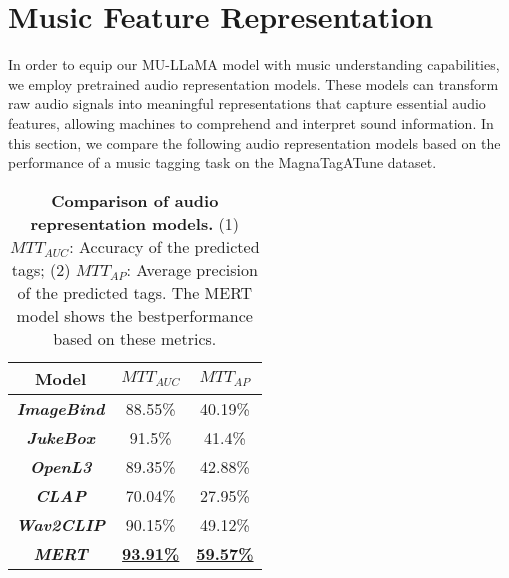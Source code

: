 \documentclass{article}
\begin{document}
\vspace{-0.2cm}
\section{Music Feature Representation}
\label{sec:music_rep}
\vspace{-0.2cm}

\noindent
In order to equip our MU-LLaMA model with music understanding capabilities, we employ pretrained audio representation models. These models can transform raw audio signals into meaningful representations that capture essential audio features, allowing machines to comprehend and interpret sound information. In this section, we compare the following audio representation models based on the performance of a music tagging task on the MagnaTagATune \cite{9aed49b956a24e99b044582665fd5b21} dataset.

\begin{table}[htbp]
\centering
\def\arraystretch{1.1}\caption{\textbf{Comparison of audio representation models.} (1) $MTT_{AUC}$: Accuracy of the predicted tags; (2) $MTT_{AP}$: Average precision of the predicted tags. The MERT model shows the bestperformance based on these metrics.}
\begin{tabular}{c|c|c}
\hline\hline
Model                       & \textbf{$MTT_{AUC}$}      & \textbf{$MTT_{AP}$}       \\ \hline\hline
\textit{\textbf{ImageBind}} & 88.55\%                & 40.19\%                \\
\textit{\textbf{JukeBox}}   & 91.5\%                 & 41.4\%                 \\
\textit{\textbf{OpenL3}}    & 89.35\%                & 42.88\%                \\
\textit{\textbf{CLAP}}      & 70.04\%                & 27.95\%                \\
\textit{\textbf{Wav2CLIP}}  & 90.15\%                & 49.12\%                \\
\textit{\textbf{MERT}}      & {\underline{\textbf{93.91\%}}} & {\underline{\textbf{59.57\%}}} \\ \hline\hline
\end{tabular}
\label{musictagging}
\end{table}
\end{document}
